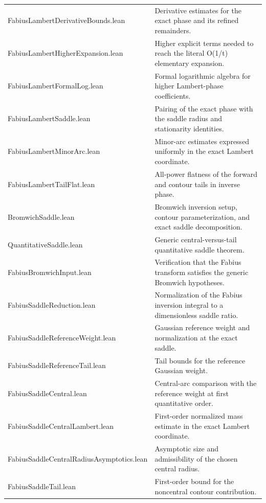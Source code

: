 \documentclass[11pt,a4paper,openany]{book}
\def\module#1{#1.lean}
\newcommand{\module}[1]{\nolinkurl{#1.lean}}
\begin{document}
\begin{longtable}{@{}>{\raggedright\arraybackslash}p{}p{}@{}}
\addlinespace[.28em]
\module{FabiusLambertDerivativeBounds} & Derivative estimates for the exact phase and its refined remainders. \\
\addlinespace[.28em]
\module{FabiusLambertHigherExpansion} & Higher explicit terms needed to reach the literal O(1/t) elementary expansion. \\
\addlinespace[.28em]
\module{FabiusLambertFormalLog} & Formal logarithmic algebra for higher Lambert-phase coefficients. \\
\addlinespace[.28em]
\module{FabiusLambertSaddle} & Pairing of the exact phase with the saddle radius and stationarity identities. \\
\addlinespace[.28em]
\module{FabiusLambertMinorArc} & Minor-arc estimates expressed uniformly in the exact Lambert coordinate. \\
\addlinespace[.28em]
\module{FabiusLambertTailFlat} & All-power flatness of the forward and contour tails in inverse phase. \\
\addlinespace[.28em]
\module{BromwichSaddle} & Bromwich inversion setup, contour parameterization, and exact saddle decomposition. \\
\addlinespace[.28em]
\module{QuantitativeSaddle} & Generic central-versus-tail quantitative saddle theorem. \\
\addlinespace[.28em]
\module{FabiusBromwichInput} & Verification that the Fabius transform satisfies the generic Bromwich hypotheses. \\
\addlinespace[.28em]
\module{FabiusSaddleReduction} & Normalization of the Fabius inversion integral to a dimensionless saddle ratio. \\
\addlinespace[.28em]
\module{FabiusSaddleReferenceWeight} & Gaussian reference weight and normalization at the exact saddle. \\
\addlinespace[.28em]
\module{FabiusSaddleReferenceTail} & Tail bounds for the reference Gaussian weight. \\
\addlinespace[.28em]
\module{FabiusSaddleCentral} & Central-arc comparison with the reference weight at first quantitative order. \\
\addlinespace[.28em]
\module{FabiusSaddleCentralLambert} & First-order normalized mass estimate in the exact Lambert coordinate. \\
\addlinespace[.28em]
\module{FabiusSaddleCentralRadiusAsymptotics} & Asymptotic size and admissibility of the chosen central radius. \\
\addlinespace[.28em]
\module{FabiusSaddleTail} & First-order bound for the noncentral contour contribution. \\

\end{longtable}
\end{document}
